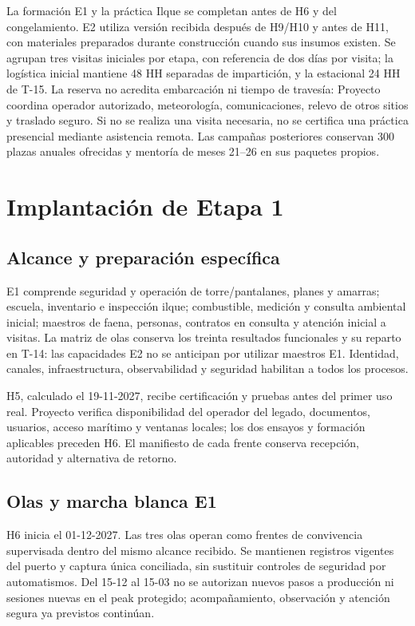 La formación E1 y la práctica Ilque se completan antes de H6 y del congelamiento. E2 utiliza versión recibida después de H9/H10 y antes de H11, con materiales preparados durante construcción cuando sus insumos existen. Se agrupan tres visitas iniciales por etapa, con referencia de dos días por visita; la logística inicial mantiene 48 HH separadas de impartición, y la estacional 24 HH de T-15. La reserva no acredita embarcación ni tiempo de travesía: Proyecto coordina operador autorizado, meteorología, comunicaciones, relevo de otros sitios y traslado seguro. Si no se realiza una visita necesaria, no se certifica una práctica presencial mediante asistencia remota. Las campañas posteriores conservan 300 plazas anuales ofrecidas y mentoría de meses 21--26 en sus paquetes propios.

\section{Implantación de Etapa 1}\label{sec:t18-e1}
\subsection{Alcance y preparación específica}
E1 comprende seguridad y operación de torre/pantalanes, planes y amarras; escuela, inventario e inspección ilque; combustible, medición y consulta ambiental inicial; maestros de faena, personas, contratos en consulta y atención inicial a visitas. La matriz de olas conserva los treinta resultados funcionales y su reparto en T-14: las capacidades E2 no se anticipan por utilizar maestros E1. Identidad, canales, infraestructura, observabilidad y seguridad habilitan a todos los procesos.

H5, calculado el 19-11-2027, recibe certificación y pruebas antes del primer uso real. Proyecto verifica disponibilidad del operador del legado, documentos, usuarios, acceso marítimo y ventanas locales; los dos ensayos y formación aplicables preceden H6. El manifiesto de cada frente conserva recepción, autoridad y alternativa de retorno.

\subsection{Olas y marcha blanca E1}
H6 inicia el 01-12-2027. Las tres olas operan como frentes de convivencia supervisada dentro del mismo alcance recibido. Se mantienen registros vigentes del puerto y captura única conciliada, sin sustituir controles de seguridad por automatismos. Del 15-12 al 15-03 no se autorizan nuevos pasos a producción ni sesiones nuevas en el peak protegido; acompañamiento, observación y atención segura ya previstos continúan.

